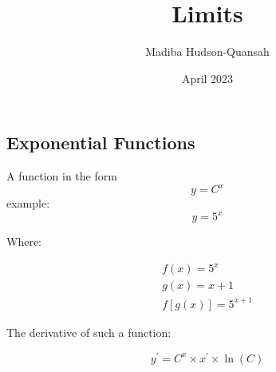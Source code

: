 \documentclass[12pt letter]{report}
\title{\Huge{Limits}}
\author{\huge{Madiba Hudson-Quansah}}
\date{April 2023}
\begin{document}
\maketitle
\newpage
{}
\tableofcontents
\pagebreak

\chapter{}
\section{Exponential Functions}

A function in the form
\[
	y = C^{x}
\]
example:
\[
	y = 5^{x}
\]

Where:

\begin{gather*}
	f(x) = 5^{x} \\
	g(x) = x+1\\[10pt]
	f[g(x)] = 5^{x+1}
\end{gather*}

The derivative of such a function:

\[
	y^{\prime} = C^{x}  \times x^{\prime}  \times  \ln(C)
\]


\end{document}
